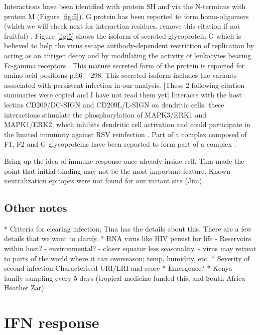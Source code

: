 \documentclass{article}
\begin{document}
Interactions  have been identified with protein SH 
\cite{rixon2005respiratory} 
and via the N-terminus with protein M 
\cite{ghildyal2005interaction} (Figure \ref{fig:5}).
G protein has been reported to form homo-oligomers (which we will check next for interaction residues. remove this citation if not fruitful)
\cite{collins1992oligomerization}.
Figure \ref{fig:5} shows the isoform of secreted glycoprotein G which is believed to help the virus escape antibody-dependent restriction of replication by acting as an antigen decoy and by modulating the activity of leukocytes bearing Fc-gamma receptors 
\cite{bukreyev2008secreted}.
This mature secreted form of the protein is reported for amino acid positions p.66 – 298.
This secreted isoform includes the variants associated with persistent infection in our analysis. 
[These 2 following citation summaries were copied and I have not read them yet] Interacts with the host lectins CD209/DC-SIGN and CD209L/L-SIGN on dendritic cells; these interactions stimulate the phosphorylation of MAPK3/ERK1 and MAPK1/ERK2, which inhibits dendritic cell activation and could participate in the limited immunity against RSV reinfection 
\cite{johnson2012respiratory}.
Part of a complex composed of F1, F2 and G glycoproteins have been reported to form part of a complex
\cite{low2008rsv}.

Bring up the idea of immune response once already inside cell. 
Tina made the point that initial binding may not be the most important feature.
Known neutralization epitopes were not found for our variant site (Jim).

\subsection{Other notes}
* Criteria for clearing infection; Tina has the details about this. 
There are a few details that we want to clarify. 
* RNA virus like HIV persist for life
	- Reservoirs within host?
	- environmental?
	- closer equator less seasonality.
	- virus may retreat to parts of the world where it can overseason; temp, humidity, etc.
* Severity of second infection
	Characterised URI/LRI and score
* Emergence?
* Kenya - family sampling every 5 days (tropical medicine funded this, and South Africa Heather Zar)



\section{IFN response}
\end{document}
